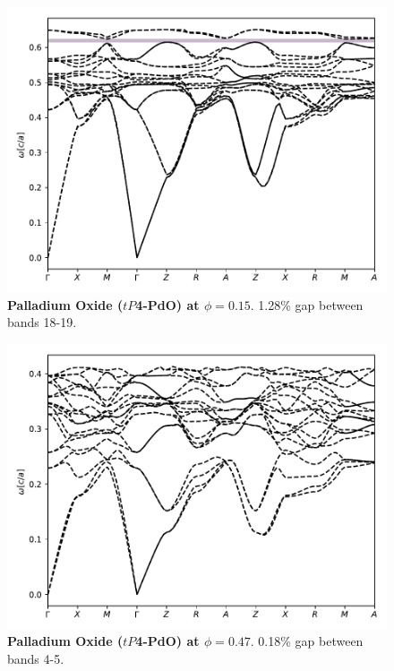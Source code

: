 \documentclass[fleqn,amsmath,amssymb,superscriptaddress, reprint,prl]{revtex4-1}
\begin{document}
\begin{figure}
\includegraphics[width=0.9\linewidth]{workspace/3ffeff60e1ef4fe0842f6f61826d67b2/images/r=25.pdf}
	\caption{\textbf{Palladium Oxide ($tP$4-PdO) at $\phi=0.15$}. 1.28\% gap between bands 18-19.}
\end{figure}

\begin{figure}
\includegraphics[width=0.9\linewidth]{workspace/3ffeff60e1ef4fe0842f6f61826d67b2/images/r=37.pdf}
	\caption{\textbf{Palladium Oxide ($tP$4-PdO) at $\phi=0.47$}. 0.18\% gap between bands 4-5.}
\end{figure}
\end{document}
